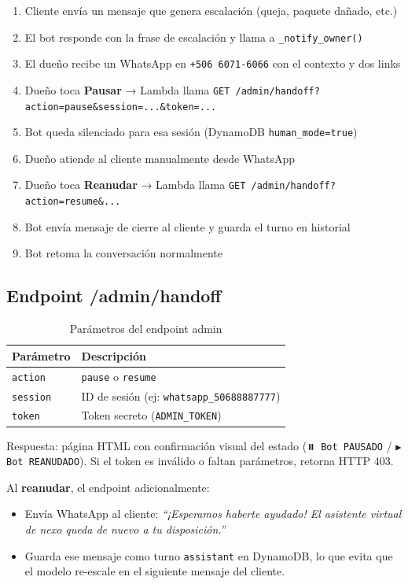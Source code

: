\documentclass[12pt,a4paper]{article}
\begin{document}
\begin{enumerate}
  \item Cliente envía un mensaje que genera escalación (queja, paquete dañado, etc.)
  \item El bot responde con la frase de escalación y llama a \texttt{\_notify\_owner()}
  \item El dueño recibe un WhatsApp en \texttt{+506 6071-6066} con el contexto y dos links
  \item Dueño toca \textbf{Pausar} → Lambda llama \texttt{GET /admin/handoff?action=pause\&session=...\&token=...}
  \item Bot queda silenciado para esa sesión (DynamoDB \texttt{human\_mode=true})
  \item Dueño atiende al cliente manualmente desde WhatsApp
  \item Dueño toca \textbf{Reanudar} → Lambda llama \texttt{GET /admin/handoff?action=resume\&...}
  \item Bot envía mensaje de cierre al cliente y guarda el turno en historial
  \item Bot retoma la conversación normalmente
\end{enumerate}

\subsection{Endpoint /admin/handoff}

\begin{table}[H]
\centering
\begin{tabular}{@{}ll@{}}
\toprule
\textbf{Parámetro} & \textbf{Descripción} \\
\midrule
\texttt{action} & \texttt{pause} o \texttt{resume} \\
\texttt{session} & ID de sesión (ej: \texttt{whatsapp\_50688887777}) \\
\texttt{token} & Token secreto (\texttt{ADMIN\_TOKEN}) \\
\bottomrule
\end{tabular}
\caption{Parámetros del endpoint admin}
\end{table}

Respuesta: página HTML con confirmación visual del estado (\texttt{⏸️ Bot PAUSADO} / \texttt{▶️ Bot REANUDADO}).
Si el token es inválido o faltan parámetros, retorna HTTP 403.

Al \textbf{reanudar}, el endpoint adicionalmente:
\begin{itemize}
  \item Envía WhatsApp al cliente: \textit{``¡Esperamos haberte ayudado! El asistente virtual de nexo queda de nuevo a tu disposición.''}
  \item Guarda ese mensaje como turno \texttt{assistant} en DynamoDB, lo que evita que el modelo re-escale en el siguiente mensaje del cliente.
\end{itemize}
\end{document}
